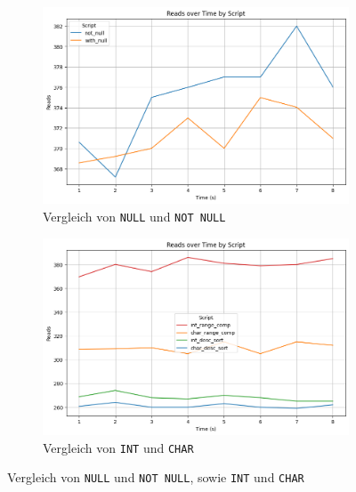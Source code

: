 \vspace{-8pt}
\begin{figure}[H]
    \centering
    \begin{subfigure}[t]{0.48\textwidth}
        \centering
        \includegraphics[width=\textwidth]{PNGs/Script/Data_Types/Null/null-check/Reads}
        \caption[Vergleich von \texttt{NULL} und \texttt{NOT NULL}]{Vergleich von \texttt{NULL} und \texttt{NOT NULL}}
        \label{data-types-null-reads}
    \end{subfigure}
    \hfill
    \begin{subfigure}[t]{0.48\textwidth}
        \centering
        \includegraphics[width=\textwidth]{PNGs/Script/Data_Types/Simpler/int-char/Reads}
        \caption{Vergleich von \texttt{INT} und \texttt{CHAR}}
        \label{data-types-int-char-reads}
    \end{subfigure}
    \vspace{-6pt}
    \caption[Datentypen: Vergleich mit Not Null, sowie Int und Char]{Vergleich von \texttt{NULL} und \texttt{NOT NULL}, sowie \texttt{INT} und \texttt{CHAR}}
\end{figure}
\vspace{-20pt}

